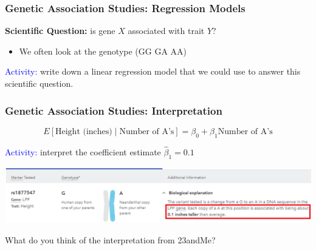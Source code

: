 \documentclass[12pt, 
hyperref={colorlinks=true, linkcolor=blue, urlcolor=cyan},dvipsnames]{beamer}
\begin{document}
\begin{frame}
\frametitle{Genetic Association Studies: Regression Models}

\textbf{Scientific Question:} is gene $X$ associated with trait $Y$?

\begin{itemize}
\item[] We often look at the genotype (GG GA AA)
\end{itemize} \pause

\textcolor{blue}{Activity:} write down a linear regression model that we could use to answer this scientific question.

\end{frame}

\begin{frame}
\frametitle{Genetic Association Studies: Interpretation}

$$E[\text{Height (inches)} \mid \text{Number of A's}] = \beta_0 + \beta_1 \text{Number of A's}$$

\textcolor{blue}{Activity:} interpret the coefficient estimate $\hat\beta_1 = 0.1$ \pause

\hspace*{-1cm}
\includegraphics[width=1.17\textwidth]{figs/23andMe_interp}

What do you think of the interpretation from 23andMe?

\end{frame}
\end{document}
